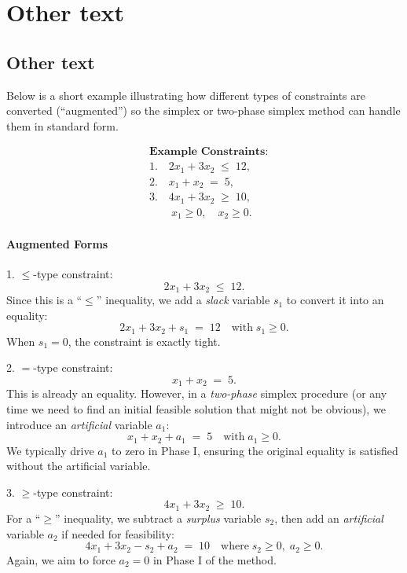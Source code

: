 
\section{Other text}
\subsection{Other text}
\noindent
Below is a short example illustrating how different types of constraints are converted (``augmented'') so the simplex or two-phase simplex method can handle them in standard form.

\[
\begin{aligned}
&\textbf{Example Constraints:}\\
&1.\quad 2x_{1} + 3x_{2} \;\le\; 12,\\
&2.\quad x_{1} + x_{2} \;=\; 5,\\
&3.\quad 4x_{1} + 3x_{2} \;\ge\; 10,\\
&\qquad x_{1} \ge 0,\quad x_{2} \ge 0.
\end{aligned}
\]

\paragraph{Augmented Forms}

1. \(\boldsymbol{\le}\)-type constraint:
\[
   2x_{1} + 3x_{2} \;\le\; 12.
\]
Since this is a ``\(\le\)'' inequality, we add a \emph{slack} variable \(s_{1}\) to convert it into an equality:
\[
   2x_{1} + 3x_{2} + s_{1} \;=\; 12
   \quad \text{with} \; s_{1} \ge 0.
\]
When \(s_{1} = 0\), the constraint is exactly tight.

2. \(\boldsymbol{=}\)-type constraint:
\[
   x_{1} + x_{2} \;=\; 5.
\]
This is already an equality. However, in a \emph{two-phase} simplex procedure (or any time we need to find an initial feasible solution that might not be obvious), we introduce an \emph{artificial} variable \(a_{1}\):
\[
   x_{1} + x_{2} + a_{1} \;=\; 5 
   \quad \text{with} \; a_{1} \ge 0.
\]
We typically drive \(a_{1}\) to zero in Phase I, ensuring the original equality is satisfied without the artificial variable.

3. \(\boldsymbol{\ge}\)-type constraint:
\[
   4x_{1} + 3x_{2} \;\ge\; 10.
\]
For a ``\(\ge\)'' inequality, we subtract a \emph{surplus} variable \(s_{2}\), then add an \emph{artificial} variable \(a_{2}\) if needed for feasibility:
\[
   4x_{1} + 3x_{2} - s_{2} + a_{2} \;=\; 10
   \quad \text{where} \; s_{2} \ge 0,\; a_{2} \ge 0.
\]
Again, we aim to force \(a_{2} = 0\) in Phase I of the method.

